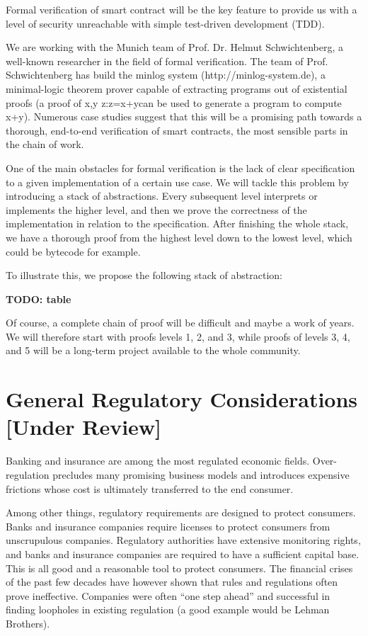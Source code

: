 \documentclass[12pt]{article}
\begin{document}
Formal verification of smart contract will be the key feature to provide us with a level of security unreachable with simple test-driven development (TDD).

We are working with the Munich team of Prof. Dr. Helmut Schwichtenberg, a well-known researcher in the field of formal verification. The team of Prof. Schwichtenberg has build the minlog system (http://minlog-system.de), a minimal-logic theorem prover capable of extracting programs out of existential proofs (a proof of x,y z:z=x+ycan be used to generate a program to compute x+y). Numerous case studies suggest that this will be a promising path towards a thorough, end-to-end verification of smart contracts, the most sensible parts in the chain of work.


One of the main obstacles for formal verification is the lack of clear specification to a given implementation of a certain use case. We will tackle this problem by introducing a stack of abstractions. Every subsequent level interprets or implements the higher level, and then we prove the correctness of the implementation in relation to the specification. After finishing the whole stack, we have a thorough proof from the highest level down to the lowest level, which could be bytecode for example.

To illustrate this, we propose the following stack of abstraction:

\textbf{TODO: table}

Of course, a complete chain of proof will be difficult and maybe a work of years. We will therefore start with proofs levels 1, 2, and 3, while proofs of levels 3, 4, and 5 will be a long-term project available to the whole community.

\section{General Regulatory Considerations [Under Review] \label{regulatory}}

Banking and insurance are among the  most regulated economic fields. Over-regulation  precludes many promising business models and introduces expensive frictions whose cost is ultimately transferred  to the end consumer.


Among other things, regulatory requirements are designed to protect consumers. Banks and insurance companies require licenses to protect consumers from unscrupulous companies. Regulatory authorities have extensive monitoring rights, and banks and insurance companies are required to have a sufficient capital base. This is all good and a reasonable tool to protect consumers. The financial crises of the past few decades have however shown that rules and regulations often prove ineffective. Companies were often “one step ahead” and successful in finding loopholes in existing regulation (a good example would be Lehman Brothers).
\end{document}
